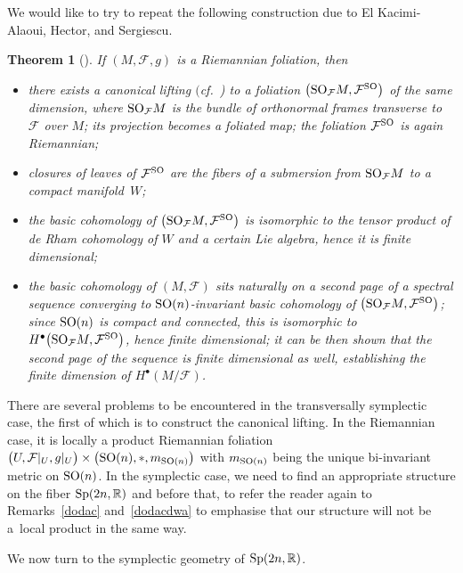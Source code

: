 \documentclass[pdftex]{sigma}
\numberwithin{equation}{section}
\newtheorem{Theorem}{Theorem}[section]
{ \theoremstyle{definition}
\newtheorem{Definition}[Theorem]{Definition}
\newtheorem{Example}[Theorem]{Example}
\newtheorem{Remark}[Theorem]{Remark} }
\begin{document}
We would like to try to repeat the following construction due to El Kacimi-Alaoui, Hector, and Sergiescu.
\begin{Theorem}[\cite{aziztopologiczny}] \label{aziz}
If $(M,\mathcal{F},g)$ is a Riemannian foliation, then
\begin{itemize}\itemsep=0pt
\item there exists a \emph{canonical lifting} $($cf.~{\rm \cite[Proposition~2.4]{molino})} to a foliation $\big({\rm SO}_{\mathcal{F}}M,\mathcal{F}^{{\rm SO}}\big)$ of the same dimension, where ${\rm SO}_{\mathcal{F}}M$ is the bundle of orthonormal frames transverse to $\mathcal{F}$ over $M$; its projection becomes a foliated map; the foliation $\mathcal{F}^{{\rm SO}}$ is again Riemannian;
\item closures of leaves of $\mathcal{F}^{{\rm SO}}$ are the fibers of a submersion from ${\rm SO}_{\mathcal{F}}M$ to a compact mani\-fold~$W$;
\item the basic cohomology of $\big({\rm SO}_{\mathcal{F}}M,\mathcal{F}^{{\rm SO}}\big)$ is isomorphic to the tensor product of de Rham cohomology of $W$ and a certain Lie algebra, hence it is finite dimensional;
\item the basic cohomology of $(M,\mathcal{F})$ sits naturally on a second page of a spectral sequence converging to ${\rm SO}(n)$-invariant basic cohomology of $\big({\rm SO}_{\mathcal{F}}M,\mathcal{F}^{{\rm SO}}\big)$; since ${\rm SO}(n)$ is compact and connected, this is isomorphic to $H^{\bullet}\big({\rm SO}_{\mathcal{F}}M,\mathcal{F}^{{\rm SO}}\big)$, hence finite dimensional; it can be then shown that the second page of the sequence is finite dimensional as well, establishing the finite dimension of $H^{\bullet}(M\slash\mathcal{F})$.
\end{itemize}
\end{Theorem}
There are several problems to be encountered in the transversally symplectic case, the first of which is to construct the canonical lifting. In the Riemannian case, it is locally a product Riemannian foliation $\big(U,\mathcal{F}|_U,g|_U\big)\times \big({\rm SO}(n),\ast,m_{{\rm SO}(n)}\big)$ with $m_{{\rm SO}(n)}$ being the unique bi-invariant metric on ${\rm SO}(n)$. In the symplectic case, we need to find an appropriate structure on the fiber ${\rm Sp}(2n,\mathbb{R})$ and before that, to refer the reader again to Remarks~\ref{dodac} and~\ref{dodacdwa} to emphasise that our structure will not be a~local product in the same way.

We now turn to the symplectic geometry of ${\rm Sp}(2n,\mathbb{R})$.
\end{document}
